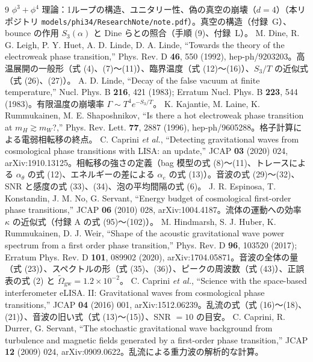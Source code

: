\documentclass[a4paper,10pt]{ltjsarticle}
\begin{document}
\begin{thebibliography}{9}
\small
{} $\phi^3+\phi^4$ 理論：1ループの構造、ユニタリー性、偽の真空の崩壊（$d=4$）（本リポジトリ \nolinkurl{models/phi34/ResearchNote/note.pdf}）。真空の構造（付録~G）、bounce の作用 $S_3(\alpha)$ と Dine らとの照合（手順 (9)、付録~L）。
 M. Dine, R. G. Leigh, P. Y. Huet, A. D. Linde, D. A. Linde, ``Towards the theory of the electroweak phase transition,'' Phys. Rev. D \textbf{46}, 550 (1992), hep-ph/9203203。高温展開の一般形（式 (4)、(7)〜(11)）、臨界温度（式 (12)〜(16)）、$S_3/T$ の近似式（式 (26)、(27)）。
 A. D. Linde, ``Decay of the false vacuum at finite temperature,'' Nucl. Phys. B \textbf{216}, 421 (1983); Erratum Nucl. Phys. B \textbf{223}, 544 (1983)。有限温度の崩壊率 $\Gamma\sim T^4e^{-S_3/T}$。
 K. Kajantie, M. Laine, K. Rummukainen, M. E. Shaposhnikov, ``Is there a hot electroweak phase transition at $m_H\gtrsim m_W$?,'' Phys. Rev. Lett. \textbf{77}, 2887 (1996), hep-ph/9605288。格子計算による電弱相転移の終点。
 C. Caprini \textit{et al.}, ``Detecting gravitational waves from cosmological phase transitions with LISA: an update,'' JCAP \textbf{03} (2020) 024, arXiv:1910.13125。相転移の強さの定義（bag 模型の式 (8)〜(11)、トレースによる $\alpha_\theta$ の式 (12)、エネルギーの差による $\alpha_e$ の式 (13)）。音波の式 (29)〜(32)、SNR と感度の式 (33)、(34)、泡の平均間隔の式 (6)。
 J. R. Espinosa, T. Konstandin, J. M. No, G. Servant, ``Energy budget of cosmological first-order phase transitions,'' JCAP \textbf{06} (2010) 028, arXiv:1004.4187。流体の運動への効率 $\kappa$ の近似式（付録 A の式 (95)〜(102)）。
 M. Hindmarsh, S. J. Huber, K. Rummukainen, D. J. Weir, ``Shape of the acoustic gravitational wave power spectrum from a first order phase transition,'' Phys. Rev. D \textbf{96}, 103520 (2017); Erratum Phys. Rev. D \textbf{101}, 089902 (2020), arXiv:1704.05871。音波の全体の量（式 (23)）、スペクトルの形（式 (35)、(36)）、ピークの周波数（式 (43)）、正誤表の式 (2) と $\tilde\Omega_{\mathrm{gw}}=1.2\times10^{-2}$。
 C. Caprini \textit{et al.}, ``Science with the space-based interferometer eLISA. II: Gravitational waves from cosmological phase transitions,'' JCAP \textbf{04} (2016) 001, arXiv:1512.06239。乱流の式（式 (16)〜(18)、(21)）、音波の旧い式（式 (13)〜(15)）、SNR $=10$ の目安。
 C. Caprini, R. Durrer, G. Servant, ``The stochastic gravitational wave background from turbulence and magnetic fields generated by a first-order phase transition,'' JCAP \textbf{12} (2009) 024, arXiv:0909.0622。乱流による重力波の解析的な計算。

\end{thebibliography}
\end{document}
